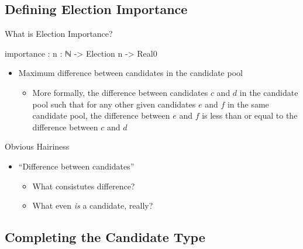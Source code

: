 \documentclass{beamer}
\begin{document}
\subsection{Defining Election Importance}

\begin{frame}{What is Election Importance?}
\begin{code}
importance : {n : ℕ} -> Election {n} -> Real0
\end{code}

\begin{itemize}
  \item Maximum difference between candidates in the candidate pool
  \begin{itemize}
    \item More formally, the difference between candidates \(c\) and \(d\) in the candidate pool such that for any other given candidates \(e\) and \(f\) in the same candidate pool, the difference between \(e\) and \(f\) is less than or equal to the difference between \(c\) and \(d\)
  \end{itemize}
\end{itemize}
\end{frame}

\begin{frame}{Obvious Hairiness}
\begin{itemize}
  \item ``Difference between candidates''
  \begin{itemize}
    \item What consistutes difference?
    \item What even \emph{is} a candidate, really?
  \end{itemize}
\end{itemize}
\end{frame}

\subsection{Completing the Candidate Type}
\end{document}
